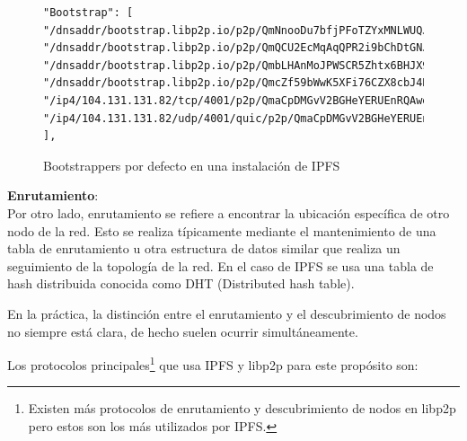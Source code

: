 \begin{figure}[H]
      \centering
      \small
      \begin{verbatim}
"Bootstrap": [
"/dnsaddr/bootstrap.libp2p.io/p2p/QmNnooDu7bfjPFoTZYxMNLWUQJyrVwtbZg5gBMjTezGAJN",
"/dnsaddr/bootstrap.libp2p.io/p2p/QmQCU2EcMqAqQPR2i9bChDtGNJchTbq5TbXJJ16u19uLTa",
"/dnsaddr/bootstrap.libp2p.io/p2p/QmbLHAnMoJPWSCR5Zhtx6BHJX9KiKNN6tpvbUcqanj75Nb",
"/dnsaddr/bootstrap.libp2p.io/p2p/QmcZf59bWwK5XFi76CZX8cbJ4BhTzzA3gU1ZjYZcYW3dwt",
"/ip4/104.131.131.82/tcp/4001/p2p/QmaCpDMGvV2BGHeYERUEnRQAwe3N8SzbUtfsmvsqQLuvuJ",
"/ip4/104.131.131.82/udp/4001/quic/p2p/QmaCpDMGvV2BGHeYERUEnRQAwe3N8SzbUtfsmvsqQLuvuJ"
],
      \end{verbatim}
      \caption{Bootstrappers por defecto en una instalación de IPFS}
      \label{fig:ipfsbootsrapper}
\end{figure}

\textbf{Enrutamiento}:
\\Por otro lado, enrutamiento se refiere a encontrar la ubicación específica de otro nodo de la red. Esto se realiza
típicamente mediante el mantenimiento de una tabla de enrutamiento u otra estructura de datos similar que realiza un
seguimiento de la topología de la red. En el caso de IPFS se usa una tabla de hash distribuida conocida como DHT (Distributed
hash table).

En la práctica, la distinción entre el enrutamiento y el descubrimiento de nodos no siempre está clara, de hecho suelen ocurrir simultáneamente.

Los protocolos principales\footnote{Existen más protocolos de enrutamiento y descubrimiento de nodos en libp2p pero estos son los más utilizados por IPFS.} que usa IPFS y libp2p para este propósito son:

